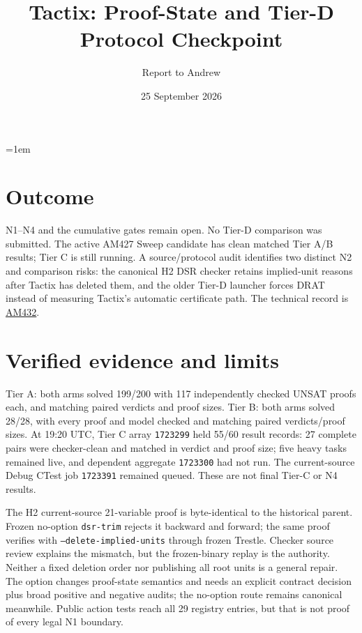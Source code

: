 \documentclass[10pt]{article}
\title{Tactix: Proof-State and Tier-D Protocol Checkpoint}
\author{Report to Andrew}
\date{25 September 2026}
\begin{document}
\maketitle
\vspace{-1.5em}
\emergencystretch=1em

\section*{Outcome}
N1--N4 and the cumulative gates remain open. No Tier-D comparison was
submitted. The active AM427 Sweep candidate has clean matched Tier A/B
results; Tier C is still running. A source/protocol audit identifies two
distinct N2 and comparison risks: the canonical H2 DSR checker retains
implied-unit reasons after Tactix has deleted them, and the older Tier-D
launcher forces DRAT instead of measuring Tactix's automatic certificate
path. The technical record is
\href{../../benchmarks/reports/2026-09-25-am432-h2-proof-state-and-tierd-route-audit.md}{AM432}.

\section*{Verified evidence and limits}
Tier A: both arms solved 199/200 with 117 independently checked UNSAT
proofs each, and matching paired verdicts and proof sizes. Tier B: both
arms solved 28/28, with every proof and model checked and matching paired
verdicts/proof sizes. At 19:20 UTC, Tier C array \texttt{1723299} held
55/60 result records: 27 complete pairs were checker-clean and matched in
verdict and proof size; five heavy tasks remained live, and dependent
aggregate \texttt{1723300} had not run. The current-source Debug CTest job
\texttt{1723391} remained queued. These are not final Tier-C or N4 results.

The H2 current-source 21-variable proof is byte-identical to the historical
parent. Frozen no-option \texttt{dsr-trim} rejects it backward and forward;
the same proof verifies with \texttt{--delete-implied-units} through frozen
Trestle. Checker source review explains the mismatch, but the frozen-binary
replay is the authority. Neither a fixed deletion order nor publishing all
root units is a general repair. The option changes proof-state semantics and
needs an explicit contract decision plus broad positive and negative audits;
the no-option route remains canonical meanwhile. Public action tests reach
all 29 registry entries, but that is not proof of every legal N1 boundary.
\end{document}
